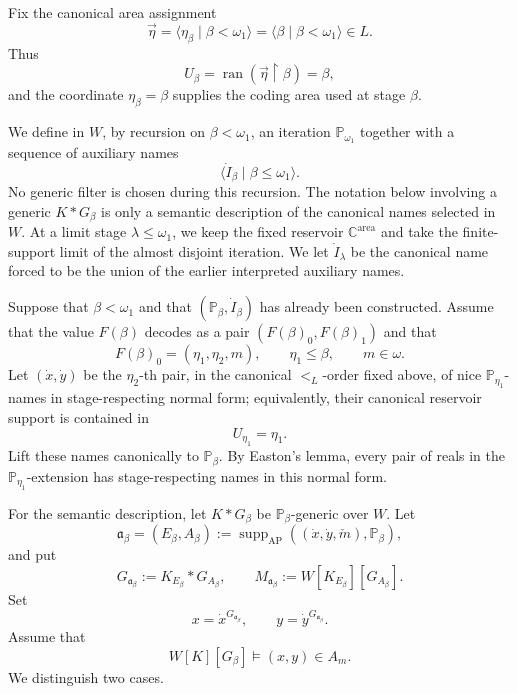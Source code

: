 \documentclass[a4paper,11pt]{article}
\newcommand{\forceP}{\mathbb{P}}
\newcommand{\forceC}{\mathbb{C}}
\begin{document}
Fix the canonical area assignment
\[
   \vec\eta=\langle\eta_\beta\mid\beta<\omega_1\rangle
   =\langle\beta\mid\beta<\omega_1\rangle\in L.
\]
Thus
\[
   U_\beta
   =\operatorname{ran}(\vec\eta\upharpoonright\beta)
   =\beta,
\]
and the coordinate $\eta_\beta=\beta$ supplies the coding area used at stage
$\beta$.

We define in $W$, by recursion on $\beta<\omega_1$, an iteration $\forceP_{\omega_1}$ together with a sequence of auxiliary names
\[
   \langle\dot I_\beta\mid\beta\leq\omega_1\rangle.
\]
No generic filter is chosen during this recursion.  The notation below involving a generic $K*G_\beta$ is only a semantic description of the canonical names selected in $W$.  At a limit stage $\lambda\leq\omega_1$, we keep the fixed reservoir $\forceC^{\mathrm{area}}$ and take the finite-support limit of the almost disjoint iteration.  We let $\dot I_\lambda$ be the canonical name forced to be the union of the earlier interpreted auxiliary names.

Suppose that $\beta<\omega_1$ and that $(\forceP_\beta,\dot I_\beta)$ has already been constructed.  Assume that the value $F(\beta)$ decodes as a pair $(F(\beta)_0,F(\beta)_1)$ and that
\[
   F(\beta)_0=(\eta_1,\eta_2,m),
   \qquad \eta_1\leq\beta,
   \qquad m\in\omega.
\]
Let $(\dot x,\dot y)$ be the $\eta_2$-th pair, in the canonical
$<_L$-order fixed above, of nice $\forceP_{\eta_1}$-names in
stage-respecting normal form; equivalently, their canonical reservoir support
is contained in
\[
   U_{\eta_1}=\eta_1.
\]
Lift these names canonically to $\forceP_\beta$.  By Easton's lemma, every
pair of reals in the $\forceP_{\eta_1}$-extension has stage-respecting names in this normal form.

For the semantic description, let $K*G_\beta$ be $\forceP_\beta$-generic over
$W$.  Let
\[
   \mathfrak a_\beta=(E_\beta,A_\beta)
   :=\operatorname{supp}_{\mathrm{AP}}
      ((\dot x,\dot y,\check m),\forceP_\beta),
\]
and put
\[
   G_{\mathfrak a_\beta}:=K_{E_\beta}*G_{A_\beta},
   \qquad
   M_{\mathfrak a_\beta}:=W[K_{E_\beta}][G_{A_\beta}].
\]
Set
\[
   x=\dot x^{G_{\mathfrak a_\beta}},
   \qquad
   y=\dot y^{G_{\mathfrak a_\beta}}.
\]
Assume that
\[
   W[K][G_\beta]\models(x,y)\in A_m.
\]
We distinguish two cases.
\end{document}
